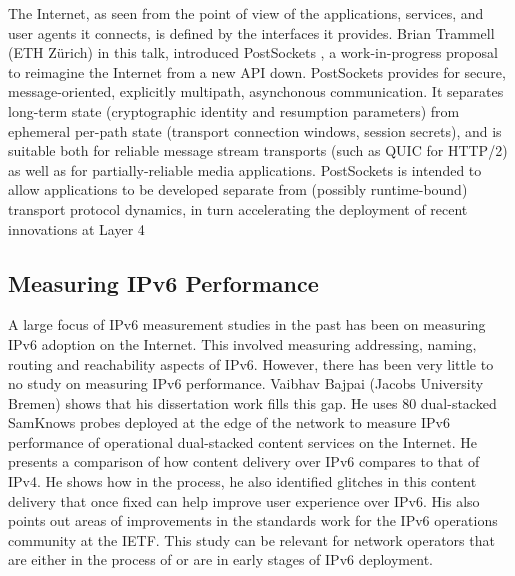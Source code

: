The Internet, as seen from the point of view of the applications, services,
and user agents it connects, is defined by the interfaces it provides. Brian
Trammell (ETH Zürich) in this talk, introduced PostSockets
\cite{draft-trammell-post-sockets}, a work-in-progress proposal to reimagine
the Internet from a new API down. PostSockets provides for secure,
message-oriented, explicitly multipath, asynchonous communication.  It
separates long-term state (cryptographic identity and resumption parameters)
from ephemeral per-path state (transport connection windows, session secrets),
and is suitable both for reliable message stream transports (such as QUIC for
HTTP/2) as well as for partially-reliable media applications. PostSockets is
intended to allow applications to be developed separate from (possibly
runtime-bound) transport protocol dynamics, in turn accelerating the
deployment of recent innovations at Layer 4

\subsection{Measuring IPv6 Performance}

A large focus of IPv6 measurement studies in the past has been on measuring
IPv6 adoption on the Internet. This involved measuring addressing, naming,
routing and reachability aspects of IPv6.  However, there has been very little
to no study on measuring IPv6 performance. Vaibhav Bajpai (Jacobs University
Bremen) shows that his dissertation work fills this gap. He uses 80
dual-stacked SamKnows \cite{vbajpai:comst:2015} probes deployed at the edge of
the network to measure IPv6 performance of operational dual-stacked content
services on the Internet.  He presents a comparison of how content delivery
\cite{vbajpai:networking:2015, sahsan:pam:2015} over IPv6 compares to that of
IPv4. He shows how in the process, he also identified glitches in this content
delivery \cite{seravuchira:cnsm:2016} that once fixed can help improve user
experience over IPv6. His also points out areas of improvements
\cite{vbajpai:anrw:2016} in the standards work for the IPv6 operations
community at the IETF. This study can be relevant for network operators that
are either in the process of or are in early stages of IPv6 deployment.


